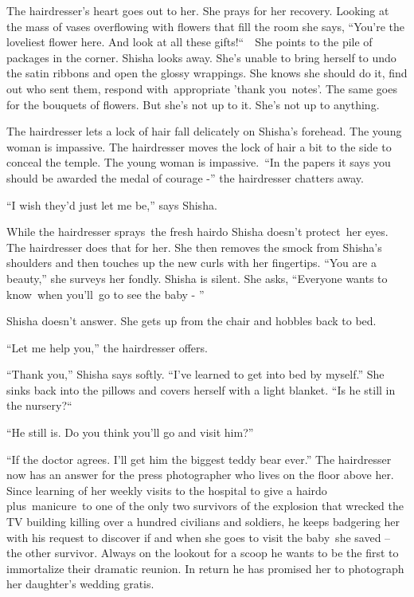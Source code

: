 \documentclass[twoside,11pt]{book}
\begin{document}
The hairdresser's heart goes out to her. She prays for her recovery. Looking at the mass of vases overflowing with
flowers that fill the room she says, ``You're the loveliest flower here. And look at all these
gifts!``\ \ She points to the pile of packages in the corner. Shisha looks away. She's unable to bring
herself to undo the satin ribbons and open the glossy wrappings. She knows she should do it, find out who sent them,
respond with~appropriate {}'thank you\ notes{}'. The same goes for the bouquets of flowers. But she's not up to it.
She's not up to anything. 

The hairdresser lets a lock of hair fall delicately on Shisha's forehead. The young woman is impassive. The hairdresser
moves the lock of hair a bit to the side to conceal the temple. The young woman is
impassive.{\ }``In the papers it says you should be awarded the
medal of courage -'' the hairdresser chatters away. 

``I wish they'd just let me be,'' says Shisha{.}

While the hairdresser sprays\ the fresh hairdo Shisha doesn't protect{\ }her
eyes. The hairdresser does that for her. She then removes the smock from Shisha's shoulders and then touches up the new
curls with her fingertips. ``You are a beauty,'' she surveys her fondly. Shisha is silent.
She asks, ``Everyone wants to know\ when you'll~go to see the baby - '' 

Shisha doesn't answer. She gets up from the chair and hobbles back to bed. 

``Let me help you,'' the hairdresser offers.

``Thank you,'' Shisha says softly. ``I've learned to get into bed by
myself.'' She sinks back into the pillows and covers herself with a light blanket. ``Is he
still in the nursery?``\ \ 

``He still is. Do you think you'll go and visit him?'' 

``If the doctor agrees. I'll get him the biggest teddy bear ever.'' The hairdresser now has an
answer for the press photographer who lives on the floor above her. Since learning of her weekly visits to the hospital
to give a hairdo plus~manicure~to one of the only two survivors of the explosion that wrecked the TV building killing
over a hundred civilians and soldiers, he keeps badgering her with his request to discover if and when she goes to
visit the baby~she saved -- the other survivor. Always on the lookout for a scoop he wants to be the first to
immortalize their dramatic reunion. In return he has promised her to photograph her daughter's wedding gratis.~ 
\end{document}
